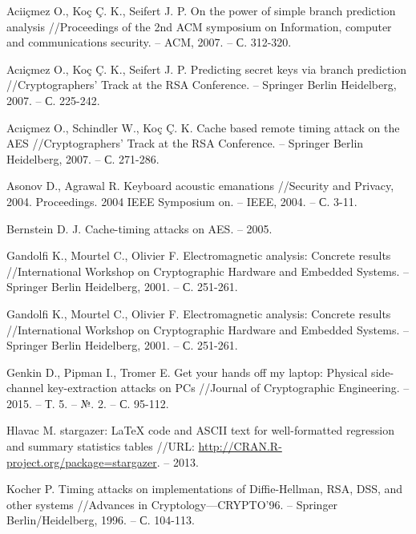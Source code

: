 \begingroup
\renewcommand{\section}[2]{\anonsection{Список используемых источников}}
\begin{thebibliography}{00}

  Aciiçmez O., Koç Ç. K., Seifert J. P. On the power of simple branch prediction analysis //Proceedings of the 2nd ACM symposium on Information, computer and communications security. – ACM, 2007. – С. 312-320.

  Acıiçmez O., Koç Ç. K., Seifert J. P. Predicting secret keys via branch prediction //Cryptographers’ Track at the RSA Conference. – Springer Berlin Heidelberg, 2007. – С. 225-242.

  Acıiçmez O., Schindler W., Koç Ç. K. Cache based remote timing attack on the AES //Cryptographers’ Track at the RSA Conference. – Springer Berlin Heidelberg, 2007. – С. 271-286.

  Asonov D., Agrawal R. Keyboard acoustic emanations //Security and Privacy, 2004. Proceedings. 2004 IEEE Symposium on. – IEEE, 2004. – С. 3-11.

  Bernstein D. J. Cache-timing attacks on AES. – 2005.

  Gandolfi K., Mourtel C., Olivier F. Electromagnetic analysis: Concrete results //International Workshop on Cryptographic Hardware and Embedded Systems. – Springer Berlin Heidelberg, 2001. – С. 251-261.

  Gandolfi K., Mourtel C., Olivier F. Electromagnetic analysis: Concrete results //International Workshop on Cryptographic Hardware and Embedded Systems. – Springer Berlin Heidelberg, 2001. – С. 251-261.

  Genkin D., Pipman I., Tromer E. Get your hands off my laptop: Physical side-channel key-extraction attacks on PCs //Journal of Cryptographic Engineering. – 2015. – Т. 5. – №. 2. – С. 95-112. 

  Hlavac M. stargazer: LaTeX code and ASCII text for well-formatted regression and summary statistics tables //URL: \url{http://CRAN.R-project.org/package=stargazer}. – 2013.

  Kocher P. Timing attacks on implementations of Diffie-Hellman, RSA, DSS, and other systems //Advances in Cryptology—CRYPTO’96. – Springer Berlin/Heidelberg, 1996. – С. 104-113.


\end{thebibliography}
